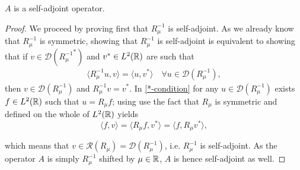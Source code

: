 \begin{theorem} \label{2.3:thm-ASelfAdjoint}
	$A$ is a self-adjoint operator.
		
	\begin{proof}
		We proceed by proving first that $R_{\mu}^{-1}$ is self-adjoint. As we already know that $R_{\mu}^{-1}$ is symmetric, showing that $R_{\mu}^{-1}$ is self-adjoint is equivalent to showing that if $v \in \mathcal{D}({R_{\mu}^{-1}}^{*})$ and $v^{*} \in L^{2}(\mathbb{R})$ are such that
		\begin{align}
			\langle R_{\mu}^{-1} u, v \rangle = \langle u, v^{*} \rangle \quad \forall u \in \mathcal{D}(R_{\mu}^{-1}), \label{*-condition}
		\end{align}
		then $v \in \mathcal{D}(R_{\mu}^{-1})$ and $R_{\mu}^{-1} v = v^{*}$.
		In \eqref{*-condition} for any $u \in \mathcal{D}(R_{\mu}^{-1})$ exists $f \in L^{2}(\mathbb{R})$ such that $u = R_{\mu} f$; using use the fact that $R_{\mu}$ is symmetric and defined on the whole of $L^{2}(\mathbb{R})$ yields
		\[  \langle f, v \rangle = \langle R_{\mu} f, v^{*} \rangle = \langle f, R_{\mu} v^{*} \rangle, \]
		
		which means that $v \in \mathcal{R}(R_{\mu}) = \mathcal{D}(R_{\mu}^{-1})$, i.e. $R_{\mu}^{-1}$ is self-adjoint. As the operator $A$ is simply $R_{\mu}^{-1}$ shifted by $\mu \in \mathbb{R}$, $A$ is hence self-adjoint as well.		
	\end{proof}
\end{theorem}
